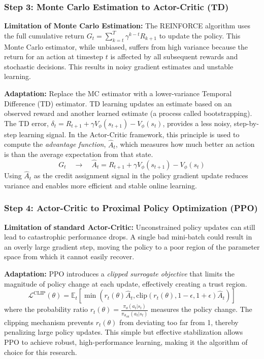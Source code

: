 \subsubsection{Step 3: Monte Carlo Estimation to Actor-Critic (TD)}
\textbf{Limitation of Monte Carlo Estimation:} The REINFORCE algorithm uses the full cumulative return \(G_t = \sum_{k=t}^{T} \gamma^{k-t} R_{k+1}\) to update the policy. This Monte Carlo estimator, while unbiased, suffers from high variance because the return for an action at timestep \(t\) is affected by all subsequent rewards and stochastic decisions. This results in noisy gradient estimates and unstable learning.

\textbf{Adaptation:} Replace the MC estimator with a lower-variance Temporal Difference (TD) estimator. TD learning updates an estimate based on an observed reward and another learned estimate (a process called bootstrapping). The TD error, \(\delta_t = R_{t+1} + \gamma V_\phi(s_{t+1}) - V_\phi(s_t)\), provides a less noisy, step-by-step learning signal. In the Actor-Critic framework, this principle is used to compute the \textit{advantage function}, \(\hat{A}_t\), which measures how much better an action is than the average expectation from that state.
\[
G_t \quad \longrightarrow \quad \hat{A}_t = R_{t+1} + \gamma V_\phi(s_{t+1}) - V_\phi(s_t)
\]
Using \(\hat{A}_t\) as the credit assignment signal in the policy gradient update reduces variance and enables more efficient and stable online learning.

\subsubsection{Step 4: Actor-Critic to Proximal Policy Optimization (PPO)}
\textbf{Limitation of standard Actor-Critic:} Unconstrained policy updates can still lead to catastrophic performance drops. A single bad mini-batch could result in an overly large gradient step, moving the policy to a poor region of the parameter space from which it cannot easily recover.

\textbf{Adaptation:} PPO \cite{schulmanProximalPolicyOptimization2017} introduces a \textit{clipped surrogate objective} that limits the magnitude of policy change at each update, effectively creating a trust region.
\[
\mathcal{L}^{\text{CLIP}}(\theta) = \mathbb{E}_{t} \left[ \min\left( r_t(\theta) \hat{A}_t, \text{clip}(r_t(\theta), 1-\epsilon, 1+\epsilon) \hat{A}_t \right) \right]
\]
where the probability ratio \(r_t(\theta) = \frac{\pi_\theta(a_t|s_t)}{\pi_{\theta_{\text{old}}}(a_t|s_t)}\) measures the policy change. The clipping mechanism prevents \(r_t(\theta)\) from deviating too far from 1, thereby penalizing large policy updates. This simple but effective stabilization allows PPO to achieve robust, high-performance learning, making it the algorithm of choice for this research.

